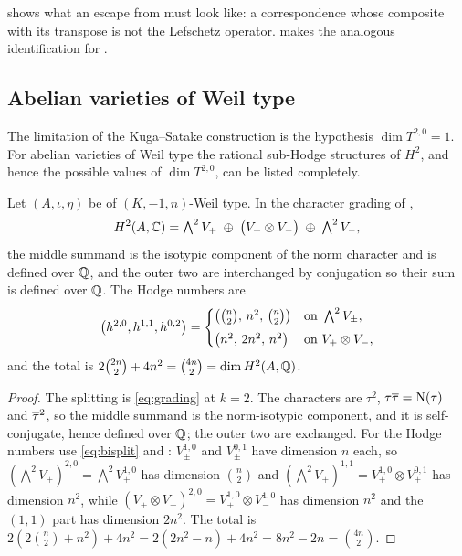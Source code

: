  shows what an escape from 
must look like: a correspondence whose composite with its transpose is not the
Lefschetz operator.  makes the analogous identification for
.

\subsection{Abelian varieties of Weil type}

The limitation of the Kuga--Satake construction is the hypothesis
$\dim T^{2,0}=1$. For abelian varieties of Weil type the rational sub-Hodge
structures of $H^{2}$, and hence the possible values of $\dim T^{2,0}$, can be
listed completely.

\begin{proposition}\label{prop:h2pieces}
Let $(A,\iota,\eta)$ be of $(K,-1,n)$-Weil type. In the character grading of
,
\begin{equation}\label{eq:h2split}
  H^{2}(A,\mathbb{C})
  =\textstyle\bigwedge^{2}V_{+}\;\oplus\;\bigl(V_{+}\otimes V_{-}\bigr)
   \;\oplus\;\bigwedge^{2}V_{-},
\end{equation}
the middle summand is the isotypic component of the norm character and is
defined over $\mathbb{Q}$, and the outer two are interchanged by conjugation so their
sum is defined over $\mathbb{Q}$. The Hodge numbers are
\[
  \bigl(h^{2,0},h^{1,1},h^{0,2}\bigr)=
  \begin{cases}
    \bigl(\tbinom{n}{2},\,n^{2},\,\tbinom{n}{2}\bigr)
      & \text{on }\bigwedge^{2}V_{\pm},\\[4pt]
    \bigl(n^{2},\,2n^{2},\,n^{2}\bigr)
      & \text{on }V_{+}\otimes V_{-},
  \end{cases}
\]
and the total is $2\tbinom{2n}{2}+4n^{2}=\tbinom{4n}{2}=\dim H^{2}(A,\mathbb{Q})$.
\end{proposition}

\begin{proof}
The splitting is \eqref{eq:grading} at $k=2$. The characters are
$\tau^{2}$, $\tau\overline{\tau}=\mathrm{N}(\tau)$ and $\overline{\tau}^{2}$, so the middle
summand is the norm-isotypic component, and it is self-conjugate, hence defined
over $\mathbb{Q}$; the outer two are exchanged. For the Hodge numbers use
\eqref{eq:bisplit} and : $V_{\pm}^{1,0}$ and
$V_{\pm}^{0,1}$ have dimension $n$ each, so
$(\bigwedge^{2}V_{+})^{2,0}=\bigwedge^{2}V^{1,0}_{+}$ has dimension
$\binom{n}{2}$ and $(\bigwedge^{2}V_{+})^{1,1}=V^{1,0}_{+}\otimes V^{0,1}_{+}$
has dimension $n^{2}$, while
$(V_{+}\otimes V_{-})^{2,0}=V^{1,0}_{+}\otimes V^{1,0}_{-}$ has dimension
$n^{2}$ and the $(1,1)$ part has dimension $2n^{2}$. The total is
$2(2\binom{n}{2}+n^{2})+4n^{2}=2(2n^{2}-n)+4n^{2}=8n^{2}-2n=\binom{4n}{2}$.
\end{proof}


